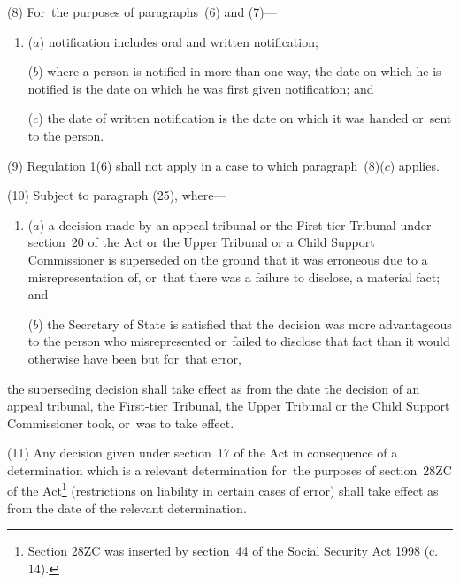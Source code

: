 \documentclass[a4paper,12pt]{article}
\begin{document}
(8) For~the purposes of paragraphs~(6) and (7)---
\begin{enumerate}\item[]
($a$) notification includes oral and written notification;

($b$) where a person is notified in more than one way, the date on which he is notified is the date on which he was first given notification; and

($c$) the date of written notification is the date on which it was handed or~sent to the person.
\end{enumerate}

(9) Regulation 1(6) shall not apply in a case to which paragraph~(8)($c$) applies.

(10) 
Subject to paragraph (25),  %
where---
\begin{enumerate}\item[]
($a$) a decision made by 
an appeal tribunal or the First-tier Tribunal under section~20 of the Act or the Upper Tribunal or a Child Support Commissioner  %
is superseded on the ground that it was erroneous due to a misrepresentation of, or~that there was a failure to disclose, a material fact; and

($b$) the Secretary of State is satisfied that the decision was more advantageous to the person who misrepresented or~failed to disclose that fact than it would otherwise have been but for~that error,
\end{enumerate}
the superseding decision shall take effect as from the date the decision of 
an appeal tribunal, the First-tier Tribunal, the Upper Tribunal or the Child Support Commissioner  %
took, or~was to take effect.

(11) Any decision given under section~17 of the Act in consequence of a determination which is a relevant determination for~the purposes of section~28ZC of the Act\footnote{\frenchspacing Section 28ZC was inserted by section~44 of the Social Security Act 1998 (c. 14).} (restrictions on liability in certain cases of error) shall take effect as from the date of the relevant determination.
\end{document}

